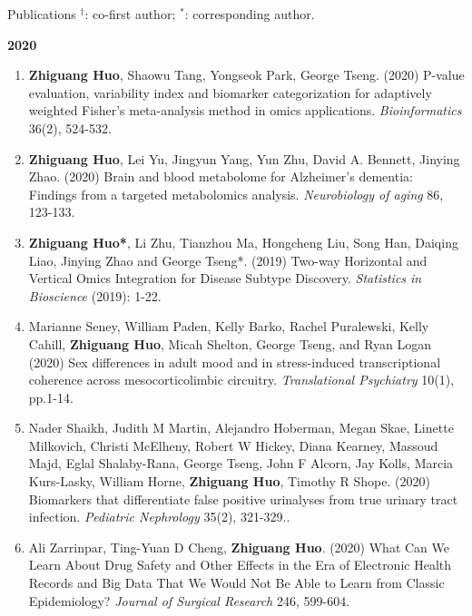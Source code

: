 \documentclass{resume} %
\begin{document}
\begin{rSection}{Publications}
$^\dagger$: co-first author; $^*$: corresponding author.

\textbf{2020}
\begin{enumerate}[noitemsep,topsep=0pt]

\item  {\bf  Zhiguang Huo}, Shaowu Tang, Yongseok Park, George Tseng. (2020) 
P-value evaluation, variability index and biomarker categorization for adaptively weighted Fisher's meta-analysis method in omics applications. 
\emph{Bioinformatics} 36(2), 524-532.

\item  {\bf Zhiguang Huo}, Lei Yu, Jingyun Yang, Yun Zhu,  David A. Bennett, Jinying Zhao. (2020)
Brain and blood metabolome for Alzheimer's dementia: Findings from a targeted metabolomics analysis.
\emph{Neurobiology of aging}  86, 123-133.

\item {\bf  Zhiguang Huo*}, Li Zhu, Tianzhou Ma, Hongcheng Liu, Song Han, Daiqing Liao, Jinying Zhao and George Tseng*.  (2019)
Two-way Horizontal and Vertical Omics Integration for Disease Subtype Discovery. \emph{Statistics in Bioscience} (2019): 1-22.

\item 
Marianne Seney, William Paden, Kelly Barko, Rachel Puralewski, Kelly Cahill, {\bf Zhiguang Huo}, Micah Shelton, George Tseng, and Ryan Logan
(2020)
Sex differences in adult mood and in stress-induced transcriptional coherence across mesocorticolimbic circuitry.
\emph{Translational Psychiatry}  10(1), pp.1-14.

\item
Nader Shaikh, Judith M Martin, Alejandro Hoberman, Megan Skae, Linette Milkovich, Christi McElheny, Robert W Hickey, Diana Kearney, Massoud Majd, Eglal Shalaby-Rana, George Tseng, John F Alcorn, Jay Kolls, Marcia Kurs-Lasky, William Horne, {\bf Zhiguang Huo}, Timothy R Shope. 
(2020)
Biomarkers that differentiate false positive urinalyses from true urinary tract infection. 
\emph{Pediatric Nephrology}  35(2), 321-329..




\item
Ali Zarrinpar,  Ting-Yuan D Cheng, {\bf Zhiguang Huo}. (2020)
What Can We Learn About Drug Safety and Other Effects in the Era of Electronic Health Records and Big Data That We Would Not Be Able to Learn from Classic Epidemiology?
\emph{Journal of Surgical Research} 246, 599-604.



\end{enumerate}
\end{rSection}
\end{document}

